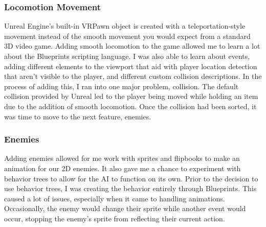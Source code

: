 \documentclass{sigchi}
\begin{document}
\subsubsection*{Locomotion Movement} Unreal Engine’s built-in VRPawn object is created with a teleportation-style movement instead of the smooth movement you would expect from a standard 3D video game. Adding smooth locomotion to the game allowed me to learn a lot about the Blueprints scripting language. I was also able to learn about events, adding different elements to the viewport that aid with player location detection that aren’t visible to the player, and different custom collision descriptions. In the process of adding this, I ran into one major problem, collision. The default collision provided by Unreal led to the player being moved while holding an item due to the addition of smooth locomotion. Once the collision had been sorted, it was time to move to the next feature, enemies. 
\subsubsection*{Enemies} Adding enemies allowed for me work with sprites and flipbooks to make an animation for our 2D enemies. It also gave me a chance to experiment with behavior trees to allow for the AI to function on its own. Prior to the decision to use behavior trees, I was creating the behavior entirely through Blueprints. This caused a lot of issues, especially when it came to handling animations. Occasionally, the enemy would change their sprite while another event would occur, stopping the enemy’s sprite from reflecting their current action. 
\end{document}
